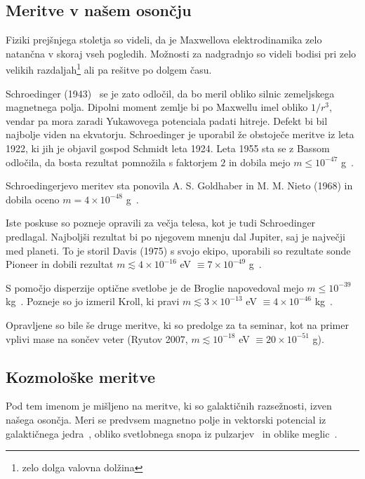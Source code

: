 \documentclass[a4paper, twocolumn, titlepage]{article}
\begin{document}
\subsection{Meritve v našem osončju}

Fiziki prejšnjega stoletja so videli, da je Maxwellova elektrodinamika zelo natančna v skoraj vseh pogledih. Možnosti za nadgradnjo so videli
bodisi pri zelo velikih razdaljah\footnote{zelo dolga valovna dolžina} ali pa rešitve po dolgem času.

Schroedinger (1943)~\cite{nieto1} se je zato odločil, da bo meril obliko silnic zemeljskega magnetnega polja. Dipolni moment zemlje bi po
Maxwellu imel obliko $1/r^3$, vendar pa mora zaradi Yukawovega potenciala padati hitreje. Defekt bi bil najbolje viden na ekvatorju.
Schroedinger je uporabil že obstoječe meritve iz leta 1922, ki jih je objavil gospod Schmidt leta 1924. Leta 1955 sta se z Bassom odločila,
da bosta rezultat pomnožila s faktorjem $2$ in dobila mejo $m \leq 10^{-47}$ g~\cite{nieto1}.

Schroedingerjevo meritev sta ponovila A. S. Goldhaber in M. M. Nieto (1968) in dobila oceno $m = 4 \times 10^{-48}$ g~\cite{nieto1, over}.

Iste poskuse so pozneje opravili za večja telesa, kot je tudi Schroedinger predlagal. Najboljši rezultat bi po njegovem mnenju dal Jupiter,
saj je največji med planeti. To je storil Davis (1975) s svojo ekipo, uporabili so rezultate sonde Pioneer in dobili rezultat
$m \lesssim 4\times10^{-16}$ eV $\equiv 7 \times 10^{-49}$ g~\cite{nieto2,over}.

S pomočjo disperzije optične svetlobe je de Broglie napovedoval mejo $m \leq 10^{-39}$ kg~\cite{nieto2}. Pozneje so jo izmeril Kroll,
ki pravi $m \lesssim 3 \times 10^{-13}$ eV $\equiv 4 \times 10^{-46}$ kg~\cite{nieto2}.

Opravljene so bile še druge meritve, ki so predolge za ta seminar, kot na primer vplivi mase na sončev veter (Ryutov 2007,
$m \lesssim 10^{-18}$ eV $\equiv 20\times10^{-51}$ g).

\subsection{Kozmološke meritve}

Pod tem imenom je mišljeno na meritve, ki so galaktičnih razsežnosti, izven našega osončja. Meri se predvsem magnetno polje in
vektorski potencial
iz galaktičnega jedra~\cite{over}, obliko svetlobnega snopa iz pulzarjev~\cite{nieto1} in oblike meglic~\cite{nieto2}.
\end{document}

